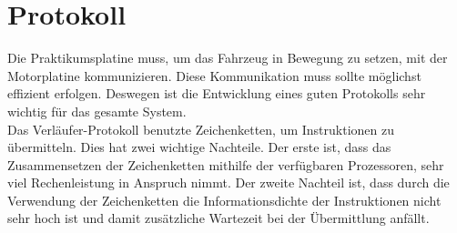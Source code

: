 \chapter{Protokoll\label{chapter_protokoll}}
Die Praktikumsplatine muss, um das Fahrzeug in Bewegung zu setzen, mit
der Motorplatine kommunizieren. Diese Kommunikation muss sollte möglichst
effizient erfolgen. Deswegen ist die Entwicklung eines guten Protokolls
sehr wichtig für das gesamte System.\\
Das Verläufer-Protokoll benutzte Zeichenketten, um Instruktionen zu übermitteln.
Dies hat zwei wichtige Nachteile. Der erste ist, dass das Zusammensetzen der
Zeichenketten mithilfe der verfügbaren Prozessoren, sehr viel Rechenleistung in
Anspruch nimmt. Der zweite Nachteil ist, dass durch die Verwendung der Zeichenketten
die Informationsdichte der Instruktionen nicht sehr hoch ist und damit zusätzliche
Wartezeit bei der Übermittlung anfällt.

